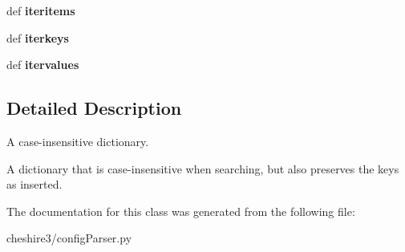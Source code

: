 \begin{DoxyCompactItemize}
\item 
\hypertarget{classcheshire3_1_1config_parser_1_1_caseless_dictionary_a41de74e4a1e5f1285c70249322eadd01}{def {\bfseries iteritems}}\label{classcheshire3_1_1config_parser_1_1_caseless_dictionary_a41de74e4a1e5f1285c70249322eadd01}

\item 
\hypertarget{classcheshire3_1_1config_parser_1_1_caseless_dictionary_a2309c7c4312543f12321d6dd986bb806}{def {\bfseries iterkeys}}\label{classcheshire3_1_1config_parser_1_1_caseless_dictionary_a2309c7c4312543f12321d6dd986bb806}

\item 
\hypertarget{classcheshire3_1_1config_parser_1_1_caseless_dictionary_a019800ae5f4338963c0faa447250fb5e}{def {\bfseries itervalues}}\label{classcheshire3_1_1config_parser_1_1_caseless_dictionary_a019800ae5f4338963c0faa447250fb5e}

\end{DoxyCompactItemize}


\subsection{Detailed Description}
\begin{DoxyVerb}A case-insensitive dictionary.

A dictionary that is case-insensitive when searching, but also preserves 
the keys as inserted.
\end{DoxyVerb}
 

The documentation for this class was generated from the following file\-:\begin{DoxyCompactItemize}
\item 
cheshire3/config\-Parser.\-py\end{DoxyCompactItemize}
